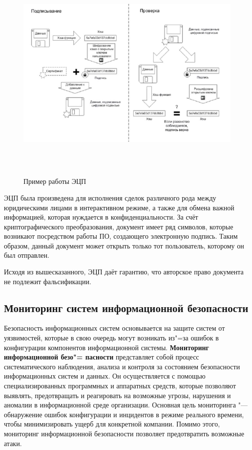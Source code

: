     \begin{figure}[H]
        \centering
        \includegraphics[height = 11cm, width = 14cm]{img/legit_doc.png}
        \caption{Пример работы ЭЦП}
    \end{figure}

    ЭЦП была произведена для исполнения сделок различного рода между юридическими лицами в интерактивном режиме,
    а также для обмена важной информацией, которая нуждается в конфиденциальности. За счёт криптографического преобразования,
    документ имеет ряд символов, которые возникают посредством работы ПО, создающего электронную подпись. Таким образом, данный документ
    может открыть только тот пользователь, которому он был отправлен.

    Исходя из вышесказанного, ЭЦП даёт гарантию, что авторское право документа не подлежит фальсификации.

\newpage
\subsection{Мониторинг систем информационной безопасности}
    Безопасность информационных систем основывается на защите систем от уязвимостей, которые в свою очередь могут возникать из"=за
    ошибок в конфигурации компонентов информационной системы. \textbf{Мониторинг информационной безо"=
    пасности} представляет собой процесс систематического 
    наблюдения, анализа и контроля за состоянием безопасности информационных систем и данных. Он осуществляется с помощью специализированных программных и 
    аппаратных средств, которые позволяют выявлять, предотвращать и реагировать на возможные угрозы, нарушения и аномалии в информационной среде организации.
    Основная цель мониторинга "--- обнаружение ошибок конфигурации и инцидентов в режиме реального времени, чтобы минимизировать ущерб для конкретной компании.
    Помимо этого, мониторинг информационной безопасности позволяет предотвратить возможные атаки.

